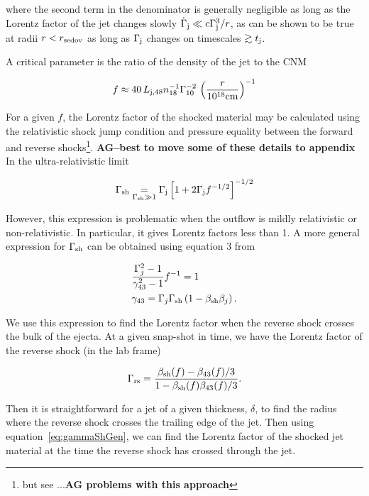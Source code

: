 \documentclass[usenatbib,fleqn]{mnras}
\begin{document}
where the second term in the denominator is generally negligible as
long as the Lorentz factor of the jet changes slowly
$\dot{\Gamma}_{\rm j} \ll c\Gamma_{\rm j}^{3}/r$, as can be shown to
be true at radii $r < r_{\rm sedov}$ as long as $\Gamma_{\rm j}$
changes on timescales $\gtrsim t_{\rm j}$.

A critical parameter is the ratio of the density of the jet to the
CNM

\begin{equation}
  f\approx 40\,  L_{\rm j,48} n_{18}^{-1} \Gamma_{10}^{-2} \, \left(\frac{r}{10^{18} {\rm
        cm}}\right)^{-1} 
\end{equation}

For a given $f$, the Lorentz factor of the shocked material may be
calculated using the relativistic shock jump condition and pressure
equality between the forward and reverse shocks\footnote{but see
  \citet{Beloborodov&Uhm2006}...{\bf AG problems with this
    approach}}. {\bf AG--best to move some of these details to
  appendix} In the ultra-relativistic limit

\begin{equation}
\Gamma_{\rm sh} \underset{\Gamma_{\rm sh} \gg 1}= \Gamma_{\rm j}\left[1 + 2\Gamma_{\rm j}f^{-1/2}\right]^{-1/2}
\end{equation}

However, this expression is problematic when the outflow is mildly
relativistic or non-relativistic. In particular, it gives Lorentz
factors less than 1. A more general expression for $\Gamma_{\rm sh}$
can be obtained using equation 3 from \citet{Beloborodov&Uhm2006}

\begin{align}
&\frac{\Gamma_j^2-1}{\gamma_{43}^2-1} f^{-1}=1\\
&\gamma_{43}=\Gamma_j \Gamma_{\rm sh} \left(1-\beta_{\rm sh} \beta_j\right).
\label{eq:gammaShGen}
\end{align}

We use this expression to find the Lorentz factor when the reverse
shock crosses the bulk of the ejecta.  At a given snap-shot in time,
we have the Lorentz factor of the reverse shock (in the lab frame)

\begin{equation}
\Gamma_{\rm rs}=\frac{\beta_{\rm sh}(f)-\beta_{43}(f)/3}{1-\beta_{\rm
    sh}(f) \beta_{43}(f)/3}.
\end{equation} 

Then it is straightforward for a jet of a given thickness, $\delta$,
to find the radius where the reverse shock crosses the trailing edge
of the jet. Then using equation~\eqref{eq:gammaShGen}, we can find the
Lorentz factor of the shocked jet material at the time the reverse
shock has crossed through the jet.  
\end{document}
